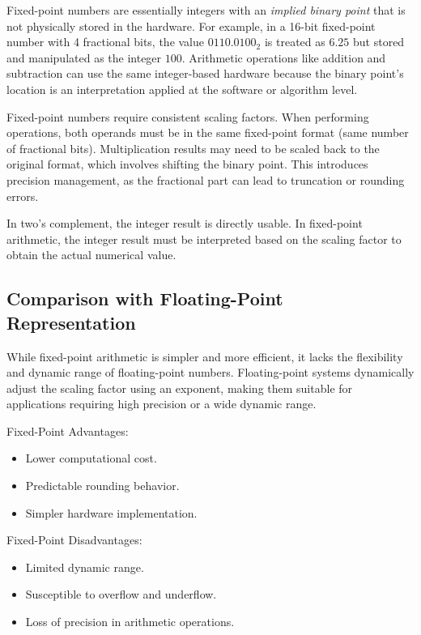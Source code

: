  Fixed-point numbers are essentially integers with an \textit{implied binary point} that is not physically stored in the hardware. For example, in a 16-bit fixed-point number with 4 fractional bits, the value \( 0110.0100_2 \) is treated as \( 6.25 \) but stored and manipulated as the integer \( 100 \). Arithmetic operations like addition and subtraction can use the same integer-based hardware because the binary point’s location is an interpretation applied at the software or algorithm level.

Fixed-point numbers require consistent scaling factors. When performing operations, both operands must be in the same fixed-point format (same number of fractional bits). Multiplication results may need to be scaled back to the original format, which involves shifting the binary point. This introduces precision management, as the fractional part can lead to truncation or rounding errors.

In two's complement, the integer result is directly usable. In fixed-point arithmetic, the integer result must be interpreted based on the scaling factor to obtain the actual numerical value.




\subsection{Comparison with Floating-Point Representation}
While fixed-point arithmetic is simpler and more efficient, it lacks the flexibility and dynamic range of floating-point numbers. Floating-point systems dynamically adjust the scaling factor using an exponent, making them suitable for applications requiring high precision or a wide dynamic range.

Fixed-Point Advantages:
        \begin{itemize}
            \item Lower computational cost.
            \item Predictable rounding behavior.
            \item Simpler hardware implementation.
        \end{itemize}
        
Fixed-Point Disadvantages:
        \begin{itemize}
            \item Limited dynamic range.
            \item Susceptible to overflow and underflow.
            \item Loss of precision in arithmetic operations.
        \end{itemize}





